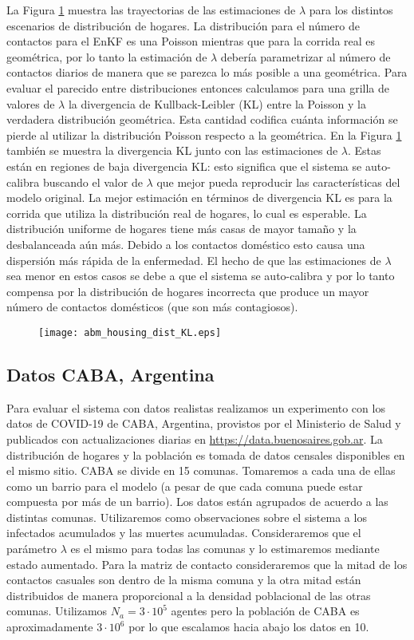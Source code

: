 La Figura \ref{fig:abm_housing_dist_KL} muestra las trayectorias de las estimaciones de $\lambda$ para los distintos escenarios de distribución de hogares. La distribución para el número de contactos para el EnKF es una Poisson mientras que para la corrida real es geométrica, por lo tanto la estimación de $\lambda$ debería parametrizar al número de contactos diarios de manera que se parezca lo más posible a una geométrica. Para evaluar el parecido entre distribuciones entonces calculamos para una grilla de valores de $\lambda$ la divergencia de Kullback-Leibler (KL) entre la Poisson y la verdadera distribución geométrica. Esta cantidad codifica cuánta información se pierde al utilizar la distribución Poisson respecto a la geométrica. En la Figura \ref{fig:abm_housing_dist_KL} también se muestra la divergencia KL junto con las estimaciones de $\lambda$. Estas están en regiones de baja divergencia KL: esto significa que el sistema se auto-calibra buscando el valor de $\lambda$ que mejor pueda reproducir las características del modelo original. La mejor estimación en términos de divergencia KL es para la corrida que utiliza la distribución real de hogares, lo cual es esperable. La distribución uniforme de hogares tiene más casas de mayor tamaño y la desbalanceada aún más. Debido a los contactos doméstico esto causa una dispersión más rápida de la enfermedad. El hecho de que las estimaciones de $\lambda$ sea menor en estos casos se debe a que el sistema se auto-calibra y por lo tanto compensa por la distribución de hogares incorrecta que produce un mayor número de contactos domésticos (que son más contagiosos).
\begin{figure}[h]
    \centering
    \texttt{[image: abm\_housing\_dist\_KL.eps]}
    \caption{}
    \label{fig:abm_housing_dist_KL}
\end{figure}

\subsection{Datos CABA, Argentina}

Para evaluar el sistema con datos realistas realizamos un experimento con los datos de COVID-19 de CABA, Argentina, provistos por el Ministerio de Salud y publicados con actualizaciones diarias en \url{https://data.buenosaires.gob.ar}. La distribución de hogares y la población es tomada de datos censales disponibles en el mismo sitio. CABA se divide en 15 comunas. Tomaremos a cada una de ellas como un barrio para el modelo (a pesar de que cada comuna puede estar compuesta por más de un barrio). Los datos están agrupados de acuerdo a las distintas comunas. Utilizaremos como observaciones sobre el sistema a los infectados acumulados y las muertes acumuladas. Consideraremos que el parámetro $\lambda$ es el mismo para todas las comunas y lo estimaremos mediante estado aumentado. Para la matriz de contacto consideraremos que la mitad de los contactos casuales son dentro de la misma comuna y la otra mitad están distribuidos de manera proporcional a la densidad poblacional de las otras comunas. Utilizamos $N_a = 3 \cdot 10^5$ agentes pero la población de CABA es aproximadamente $3 \cdot 10^6$ por lo que escalamos hacia abajo los datos en 10.

